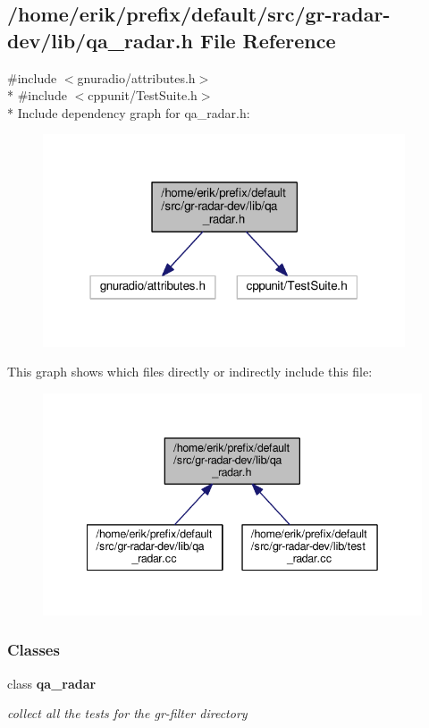 \subsection{/home/erik/prefix/default/src/gr-\/radar-\/dev/lib/qa\+\_\+radar.h File Reference}
\label{qa__radar_8h}
{\ttfamily \#include $<$gnuradio/attributes.\+h$>$}\\*
{\ttfamily \#include $<$cppunit/\+Test\+Suite.\+h$>$}\\*
Include dependency graph for qa\+\_\+radar.\+h\+:
\nopagebreak
\begin{figure}[H]
\begin{center}
\leavevmode
\includegraphics[width=304pt]{d8/df5/qa__radar_8h__incl}
\end{center}
\end{figure}
This graph shows which files directly or indirectly include this file\+:
\nopagebreak
\begin{figure}[H]
\begin{center}
\leavevmode
\includegraphics[width=342pt]{d9/df9/qa__radar_8h__dep__incl}
\end{center}
\end{figure}
\subsubsection*{Classes}
\begin{DoxyCompactItemize}
\item 
class {\bf qa\+\_\+radar}
\begin{DoxyCompactList}\small\item\em collect all the tests for the gr-\/filter directory \end{DoxyCompactList}\end{DoxyCompactItemize}
